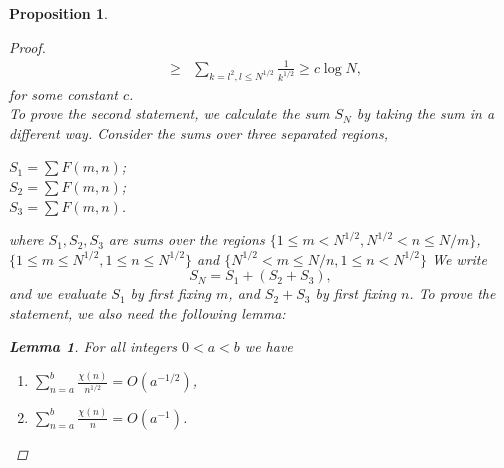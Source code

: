 \documentclass[psamsfonts]{amsart}
\newtheorem{prop}[thm]{Proposition}
\newtheorem{lem}[thm]{Lemma}
\theoremstyle{definition}
\theoremstyle{remark}
\numberwithin{equation}{section}
\begin{document}
\begin{prop}
\begin{proof}
\begin{eqnarray}
							& \geq & \sum_{k=l^2, l \leq N^{1/2}} \frac{1}{k^{1/2}} \geq c\log N,
					\end{eqnarray}
					for some constant $c$.\\
					To prove the second statement, we calculate the sum $S_N$ by taking the sum in a different way. Consider the sums over three separated regions,
					\begin{center}
						$S_1 = \sum F(m,n)$;\\
						$S_2 = \sum F(m,n)$;\\
						$S_3 = \sum F(m,n)$.
					\end{center}
					where $S_1,S_2,S_3$ are sums over the regions $\{1 \leq m < N^{1/2}, N^{1/2} < n \leq N/m\}$, $\{1 \leq m \leq N^{1/2}, 1 \leq n \leq N^{1/2}\}$ and $\{N^{1/2} < m \leq N/n, 1 \leq n < N^{1/2}\}$
					We write
					\begin{equation}
						S_N =  S_1 + (S_2 + S_3),
					\end{equation}
					and we evaluate $S_1$ by first fixing $m$, and $S_2 + S_3$ by first fixing $n$. To prove the statement, we also need the following lemma:
					
					\begin{lem}
						For all integers $0 < a < b$ we have
						\begin{enumerate}
							\item $\sum_{n=a}^{b} \frac{\chi(n)}{n^{1/2}} = O(a^{-1/2})$,
							\item $\sum_{n=a}^{b} \frac{\chi(n)}{n} = O(a^{-1})$.
						\end{enumerate}
						

\end{lem}
\end{proof}
\end{prop}
\end{document}
